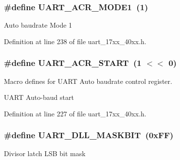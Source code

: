 \subsubsection[{\texorpdfstring{U\+A\+R\+T\+\_\+\+A\+C\+R\+\_\+\+M\+O\+D\+E1}{UART_ACR_MODE1}}]{\setlength{\rightskip}{0pt plus 5cm}\#define U\+A\+R\+T\+\_\+\+A\+C\+R\+\_\+\+M\+O\+D\+E1~(1)}\hypertarget{group__UART__17XX__40XX_ga25d690e49a3ccc696e031e8a1480dc1d}{}\label{group__UART__17XX__40XX_ga25d690e49a3ccc696e031e8a1480dc1d}
Auto baudrate Mode 1 

Definition at line 238 of file uart\+\_\+17xx\+\_\+40xx.\+h.

\subsubsection[{\texorpdfstring{U\+A\+R\+T\+\_\+\+A\+C\+R\+\_\+\+S\+T\+A\+RT}{UART_ACR_START}}]{\setlength{\rightskip}{0pt plus 5cm}\#define U\+A\+R\+T\+\_\+\+A\+C\+R\+\_\+\+S\+T\+A\+RT~(1 $<$$<$ 0)}\hypertarget{group__UART__17XX__40XX_gaf6a6a4cb65edff2871ba48d3f2b445dc}{}\label{group__UART__17XX__40XX_gaf6a6a4cb65edff2871ba48d3f2b445dc}


Macro defines for U\+A\+RT Auto baudrate control register. 

U\+A\+RT Auto-\/baud start 

Definition at line 227 of file uart\+\_\+17xx\+\_\+40xx.\+h.

\subsubsection[{\texorpdfstring{U\+A\+R\+T\+\_\+\+D\+L\+L\+\_\+\+M\+A\+S\+K\+B\+IT}{UART_DLL_MASKBIT}}]{\setlength{\rightskip}{0pt plus 5cm}\#define U\+A\+R\+T\+\_\+\+D\+L\+L\+\_\+\+M\+A\+S\+K\+B\+IT~(0x\+F\+F)}\hypertarget{group__UART__17XX__40XX_ga85050a24048ffc2de997cd60ea67f9df}{}\label{group__UART__17XX__40XX_ga85050a24048ffc2de997cd60ea67f9df}
Divisor latch L\+SB bit mask 


